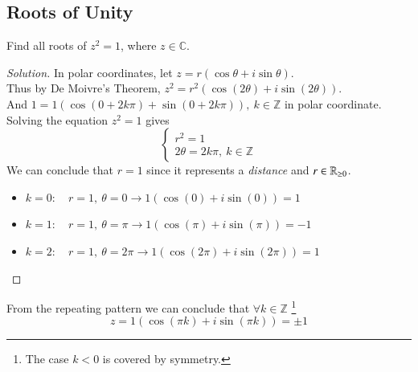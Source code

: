 \documentclass[11pt]{article}
\begin{document}
		\subsection{Roots of Unity}
		\begin{example}
			Find all roots of $z^2 = 1$, where $z \in \mathbb{C}$. 
			\begin{proof}[Solution]
				In polar coordinates, let $z = r (\cos \theta + i \sin \theta)$. \\
				Thus by De Moivre's Theorem, $z^2 = r^2 (\cos (2\theta) + i \sin(2\theta))$. \\
				And $1 = 1 (\cos(0+2k\pi) + \sin(0+2k\pi)),\ k \in \mathbb{Z}$ in polar coordinate. \\
				Solving the equation $z^2 = 1$ gives \\
				\[
					\begin{cases}
						r^2 = 1 \\
						2\theta = 2k\pi,\ k \in \mathbb{Z}
					\end{cases}
				\]
				We can conclude that $r=1$ since it represents a \emph{distance} and $r \in \mathbb{R}_{\geq 0}$. \\
				\begin{itemize}
					\item $k=0:\quad r=1,\ \theta = 0 \rightarrow 1(\cos(0) + i \sin(0)) = 1$ 
					\item $k=1:\quad r=1,\ \theta = \pi \rightarrow 1(\cos(\pi) + i \sin(\pi)) = -1$ 
					\item $k=2:\quad r=1,\ \theta = 2\pi \rightarrow 1(\cos(2\pi) + i \sin(2\pi)) = 1$
				\end{itemize}
			\end{proof}
			From the repeating pattern we can conclude that $\forall k \in \mathbb{Z}$ \footnote{The case $k<0$ is covered by symmetry.} \[z = 1 (\cos(\pi k) + i \sin(\pi k)) = \pm 1\]
		\end{example}
		
\end{document}
